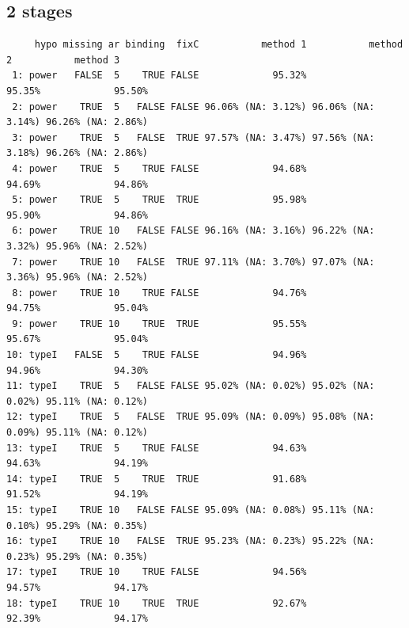 \documentclass[12pt]{article}
\begin{document}
\subsection{2 stages}
\label{sec:org3b1cced}
\begin{verbatim}
     hypo missing ar binding  fixC           method 1           method 2           method 3
 1: power   FALSE  5    TRUE FALSE             95.32%             95.35%             95.50%
 2: power    TRUE  5   FALSE FALSE 96.06% (NA: 3.12%) 96.06% (NA: 3.14%) 96.26% (NA: 2.86%)
 3: power    TRUE  5   FALSE  TRUE 97.57% (NA: 3.47%) 97.56% (NA: 3.18%) 96.26% (NA: 2.86%)
 4: power    TRUE  5    TRUE FALSE             94.68%             94.69%             94.86%
 5: power    TRUE  5    TRUE  TRUE             95.98%             95.90%             94.86%
 6: power    TRUE 10   FALSE FALSE 96.16% (NA: 3.16%) 96.22% (NA: 3.32%) 95.96% (NA: 2.52%)
 7: power    TRUE 10   FALSE  TRUE 97.11% (NA: 3.70%) 97.07% (NA: 3.36%) 95.96% (NA: 2.52%)
 8: power    TRUE 10    TRUE FALSE             94.76%             94.75%             95.04%
 9: power    TRUE 10    TRUE  TRUE             95.55%             95.67%             95.04%
10: typeI   FALSE  5    TRUE FALSE             94.96%             94.96%             94.30%
11: typeI    TRUE  5   FALSE FALSE 95.02% (NA: 0.02%) 95.02% (NA: 0.02%) 95.11% (NA: 0.12%)
12: typeI    TRUE  5   FALSE  TRUE 95.09% (NA: 0.09%) 95.08% (NA: 0.09%) 95.11% (NA: 0.12%)
13: typeI    TRUE  5    TRUE FALSE             94.63%             94.63%             94.19%
14: typeI    TRUE  5    TRUE  TRUE             91.68%             91.52%             94.19%
15: typeI    TRUE 10   FALSE FALSE 95.09% (NA: 0.08%) 95.11% (NA: 0.10%) 95.29% (NA: 0.35%)
16: typeI    TRUE 10   FALSE  TRUE 95.23% (NA: 0.23%) 95.22% (NA: 0.23%) 95.29% (NA: 0.35%)
17: typeI    TRUE 10    TRUE FALSE             94.56%             94.57%             94.17%
18: typeI    TRUE 10    TRUE  TRUE             92.67%             92.39%             94.17%
\end{verbatim}
\end{document}
